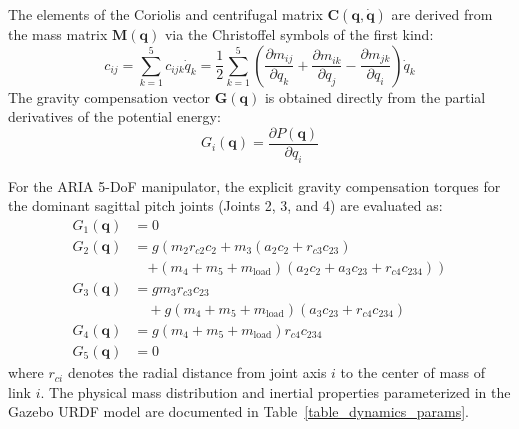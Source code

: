 \documentclass[journal]{IEEEtran}
\begin{document}
The elements of the Coriolis and centrifugal matrix $\mathbf{C}(\mathbf{q}, \dot{\mathbf{q}})$ are derived from the mass matrix $\mathbf{M}(\mathbf{q})$ via the Christoffel symbols of the first kind:
\begin{equation}
c_{ij} = \sum_{k=1}^5 c_{ijk} \dot{q}_k = \frac{1}{2} \sum_{k=1}^5 \left( \frac{\partial m_{ij}}{\partial q_k} + \frac{\partial m_{ik}}{\partial q_j} - \frac{\partial m_{jk}}{\partial q_i} \right) \dot{q}_k
\end{equation}
The gravity compensation vector $\mathbf{G}(\mathbf{q})$ is obtained directly from the partial derivatives of the potential energy:
\begin{equation}
G_i(\mathbf{q}) = \frac{\partial P(\mathbf{q})}{\partial q_i}
\end{equation}

For the ARIA 5-DoF manipulator, the explicit gravity compensation torques for the dominant sagittal pitch joints (Joints 2, 3, and 4) are evaluated as:
\begin{align}
G_1(\mathbf{q}) &= 0 \\
G_2(\mathbf{q}) &= g \left( m_2 r_{c2} c_2 + m_3 (a_2 c_2 + r_{c3} c_{23}) \right. \nonumber \\
                &\quad \left. + (m_4 + m_5 + m_{\text{load}}) (a_2 c_2 + a_3 c_{23} + r_{c4} c_{234}) \right) \\
G_3(\mathbf{q}) &= g m_3 r_{c3} c_{23} \nonumber \\
                &\quad + g (m_4 + m_5 + m_{\text{load}}) (a_3 c_{23} + r_{c4} c_{234}) \\
G_4(\mathbf{q}) &= g (m_4 + m_5 + m_{\text{load}}) r_{c4} c_{234} \\
G_5(\mathbf{q}) &= 0
\end{align}
where $r_{ci}$ denotes the radial distance from joint axis $i$ to the center of mass of link $i$. The physical mass distribution and inertial properties parameterized in the Gazebo URDF model are documented in Table~\ref{table_dynamics_params}.
\end{document}

